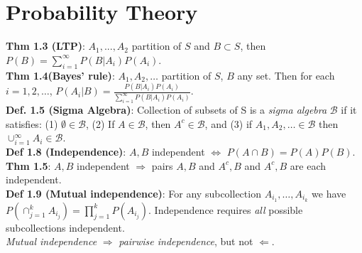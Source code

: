 \section{Probability Theory}
\textbf{Thm 1.3 (LTP)}: $A_1, ..., A_2$ partition of $S$ and $B\subset S$, then $P(B) = \sum_{i=1}^\infty P(B|A_i)P(A_i)$.\\
\textbf{Thm 1.4(Bayes' rule)}: $A_1, A_2, \ldots$ partition of $S$, $B$ any set. Then for each $i=1,2,\ldots$, $P(A_i|B) = \frac{P(B|A_i)P(A_i)}{\sum_{i=1}^\infty P(B|A_i)P(A_i)}$.\\
\textbf{Def. 1.5 (Sigma Algebra)}: Collection of subsets of S is a \textit{sigma algebra} $\mathcal{B}$ if it satisfies: (1) $\emptyset\in\mathcal{B}$, (2) If $A\in\mathcal{B}$, then $A^c\in\mathcal{B}$, and (3) if $A_1, A_2, \ldots \in\mathcal{B}$ then $\cup_{i=1}^\infty A_i\in\mathcal{B}$.\\
\textbf{Def 1.8 (Independence)}: $A, B$ independent $\Leftrightarrow$ $P(A\cap B) = P(A)P(B)$.\\
\textbf{Thm 1.5}: $A, B$ independent $\Rightarrow$ pairs $A,B$ and $A^c,B$ and $A^c,B$ are each independent.\\
\textbf{Def 1.9 (Mutual independence)}: For any subcollection $A_{i_1}, \ldots, A_{i_k}$ we have $P\left(\cap_{j=1}^kA_{i_j}\right) = \prod_{j=1}^kP(A_{i_j})$. Independence requires \textit{all} possible subcollections independent.\\
\textit{Mutual independence} $\Rightarrow$ \textit{pairwise independence}, but not $\Leftarrow$.